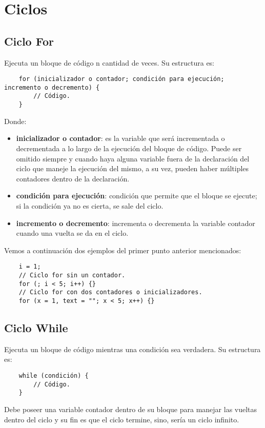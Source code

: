 \section{Ciclos}

\subsection{Ciclo For}

Ejecuta un bloque de código n cantidad de veces. Su estructura es:
\begin{lstlisting}
    for (inicializador o contador; condición para ejecución; incremento o decremento) {
        // Código.
    }
\end{lstlisting}

Donde:
\begin{itemize}
    \item \textbf{inicializador o contador}: es la variable que será incrementada o decrementada a lo largo de la ejecución del bloque de código. Puede ser omitido siempre y cuando haya alguna variable fuera de la declaración del ciclo que maneje la ejecución del mismo, a su vez, pueden haber múltiples contadores dentro de la declaración.
    \item \textbf{condición para ejecución}: condición que permite que el bloque se ejecute; si la condición ya no es cierta, se sale del ciclo.
    \item \textbf{incremento o decremento}: incrementa o decrementa la variable contador cuando una vuelta se da en el ciclo.
\end{itemize}

Vemos a continuación dos ejemplos del primer punto anterior mencionados:
\begin{lstlisting}
    i = 1;
    // Ciclo for sin un contador.
    for (; i < 5; i++) {}
    // Ciclo for con dos contadores o inicializadores.
    for (x = 1, text = ""; x < 5; x++) {}
\end{lstlisting}


\subsection{Ciclo While}

Ejecuta un bloque de código mientras una condición sea verdadera. Su estructura es:
\begin{lstlisting}
    while (condición) {
        // Código.
    }
\end{lstlisting}

Debe poseer una variable contador dentro de su bloque para manejar las vueltas dentro del ciclo y su fin es que el ciclo termine, sino, sería un ciclo infinito.


